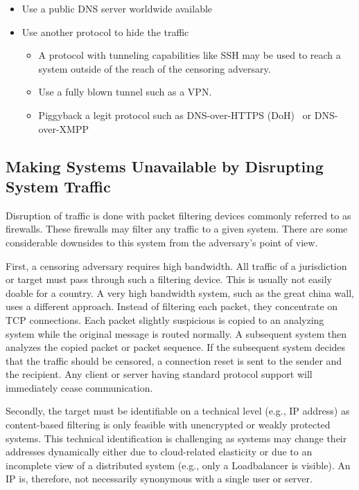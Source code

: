 \begin{itemize}
	\item Use a public DNS server worldwide available
	\item Use another protocol to hide the traffic 
	\begin{itemize}
		\item A protocol with tunneling capabilities like SSH may be used to reach a system outside of the reach of the censoring adversary.
		\item Use a fully blown tunnel such as a VPN.
		\item Piggyback a legit protocol such as DNS-over-HTTPS (DoH)~\cite{rfc8484} or DNS-over-XMPP~\cite{xep0418}
	\end{itemize}
\end{itemize}

\subsection{Making Systems Unavailable by Disrupting System Traffic}
Disruption of traffic is done with packet filtering devices commonly referred to as firewalls. These firewalls may filter any traffic to a given system. There are some considerable downsides to this system from the adversary's point of view.

First, a censoring adversary requires high bandwidth. All traffic of a jurisdiction or target must pass through such a filtering device. This is usually not easily doable for a country. A very high bandwidth system, such as the great china wall, uses a different approach. Instead of filtering each packet, they concentrate on TCP connections. Each packet slightly suspicious is copied to an analyzing system while the original message is routed normally. A subsequent system then analyzes the copied packet or packet sequence. If the subsequent system decides that the traffic should be censored, a connection reset is sent to the sender and the recipient. Any client or server having standard protocol support will immediately cease communication.

Secondly, the target must be identifiable on a technical level (e.g., IP address) as content-based filtering is only feasible with unencrypted or weakly protected systems. This technical identification is challenging as systems may change their addresses dynamically either due to cloud-related elasticity or due to an incomplete view of a distributed system (e.g., only a Loadbalancer is visible). An IP is, therefore, not necessarily synonymous with a single user or server. 

